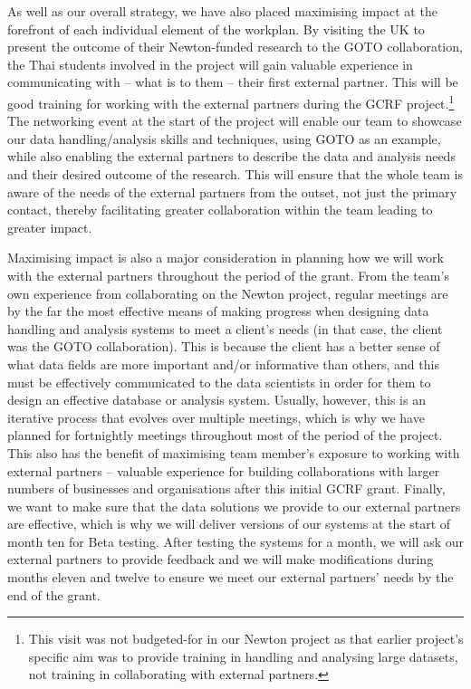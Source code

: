 \documentclass[11pt]{article}
\begin{document}
  \vspace{2mm}
  \noindent
  As well as our overall strategy, we have also placed maximising impact at the forefront of each individual element of the workplan. By visiting the UK to present the outcome of their Newton-funded research to the GOTO collaboration, the Thai students involved in the project will gain valuable experience in communicating with -- what is to them -- their first external partner. This will be good training for working with the external partners during the GCRF project.\footnote{This visit was not budgeted-for in our Newton project as that earlier project's specific aim was to provide training in handling and analysing large datasets, not training in collaborating with external partners.} The networking event at the start of the project will enable our team to showcase our data handling/analysis skills and techniques, using GOTO as an example, while also enabling the external partners to describe the data and analysis needs and their desired outcome of the research. This will ensure that the whole team is aware of the needs of the external partners from the outset, not just the primary contact, thereby facilitating greater collaboration within the team leading to greater impact.
  
  \vspace{2mm}
  \noindent
  Maximising impact is also a major consideration in planning how we will work with the external partners throughout the period of the grant. From the team's own experience from collaborating on the Newton project, regular meetings are by the far the most effective means of making progress when designing data handling and analysis systems to meet a client's needs (in that case, the client was the GOTO collaboration). This is because the client has a better sense of what data fields are more important and/or informative than others, and this must be effectively communicated to the data scientists in order for them to design an effective database or analysis system. Usually, however, this is an iterative process that evolves over multiple meetings, which is why we have planned for fortnightly meetings throughout most of the period of the project. This also has the benefit of maximising team member's exposure to working with external partners -- valuable experience for building collaborations with larger numbers of businesses and organisations after this initial GCRF grant. Finally, we want to make sure that the data solutions we provide to our external partners are effective, which is why we will deliver versions of our systems at the start of month ten for Beta testing. After testing the systems for a month, we will ask our external partners to provide feedback and we will make modifications during months eleven and twelve to ensure we meet our external partners' needs by the end of the grant. 
  
\end{document}

